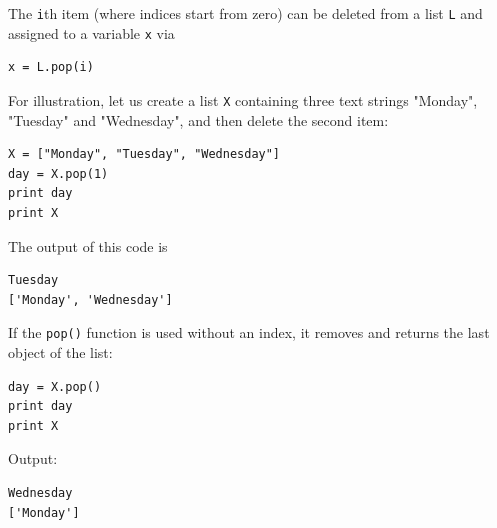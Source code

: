 \noindent
The {\tt i}th item (where indices start from zero) can be deleted 
from a list {\tt L} and assigned to a variable {\tt x} via \\

\begin{bbox}
\begin{Verbatim}[commandchars=\\\{\}]
x = L.pop(i)
\end{Verbatim}
\end{bbox}
\vspace{6mm}

\noindent
For illustration, let us create a list {\tt X} containing 
three text strings "Monday", "Tuesday" and "Wednesday", and then
delete the second item:\\

\begin{bbox}
\begin{Verbatim}[commandchars=\\\{\}]
X = ["Monday", "Tuesday", "Wednesday"]
day = X.pop(1)
print day
print X
\end{Verbatim}
\end{bbox}
\vspace{6mm}

\noindent
The output of this code is\\

\begin{ybox}
\begin{Verbatim}[commandchars=\\\{\}]
Tuesday
['Monday', 'Wednesday']
\end{Verbatim}
\end{ybox}
\vspace{6mm}

\noindent
If the {\tt pop()} function is used without an index, it removes
and returns the last object of the list:\\

\begin{bbox}
\begin{Verbatim}[commandchars=\\\{\}]
day = X.pop()
print day
print X
\end{Verbatim}
\end{bbox}
\vspace{6mm}

\noindent
Output:\\

\begin{ybox}
\begin{Verbatim}[commandchars=\\\{\}]
Wednesday
['Monday']
\end{Verbatim}
\end{ybox}
\vspace{6mm}

